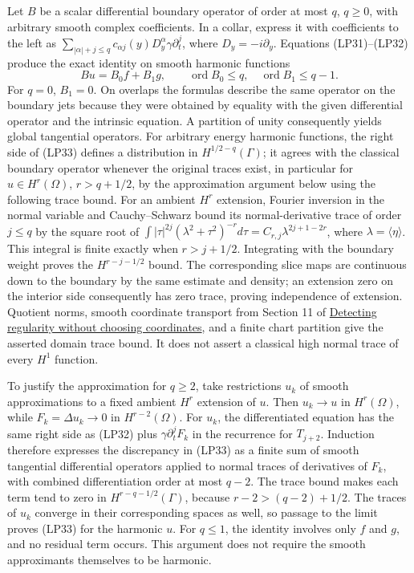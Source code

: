 \documentclass[
  11pt,
]{article}
\begin{document}
Let \(B\) be a scalar differential boundary operator of order at most
\(q\), \(q\ge0\), with arbitrary smooth complex coefficients. In a
collar, express it with coefficients to the left as
\(\sum_{|\alpha|+j\le q}c_{\alpha j}(y)D_y^\alpha\gamma\partial_t^j\),
where \(D_y=-i\partial_y\). Equations (LP31)--(LP32) produce the exact
identity on smooth harmonic functions \[
 Bu=B_0f+B_1g,\qquad
 \operatorname{ord}B_0\le q,\quad
 \operatorname{ord}B_1\le q-1.
 \tag{LP33}
\] For \(q=0\), \(B_1=0\). On overlaps the formulas describe the same
operator on the boundary jets because they were obtained by equality
with the given differential operator and the intrinsic equation. A
partition of unity consequently yields global tangential operators. For
arbitrary energy harmonic functions, the right side of (LP33) defines a
distribution in \(H^{1/2-q}(\Gamma)\); it agrees with the classical
boundary operator whenever the original traces exist, in particular for
\(u\in H^r(\Omega)\), \(r>q+1/2\), by the approximation argument below
using the following trace bound. For an ambient \(H^r\) extension,
Fourier inversion in the normal variable and Cauchy--Schwarz bound its
normal-derivative trace of order \(j\le q\) by the square root of
\(\int |\tau|^{2j}(\lambda^2+\tau^2)^{-r}d\tau=C_{r,j}\lambda^{2j+1-2r}\),
where \(\lambda=\langle\eta\rangle\). This integral is finite exactly
when \(r>j+1/2\). Integrating with the boundary weight proves the
\(H^{r-j-1/2}\) bound. The corresponding slice maps are continuous down
to the boundary by the same estimate and density; an extension zero on
the interior side consequently has zero trace, proving independence of
extension. Quotient norms, smooth coordinate transport from Section 11
of \href{geometric-microlocal-calculus.pdf}{Detecting regularity without
choosing coordinates}, and a finite chart partition give the asserted
domain trace bound. It does not assert a classical high normal trace of
every \(H^1\) function.

To justify the approximation for \(q\ge2\), take restrictions \(u_k\) of
smooth approximations to a fixed ambient \(H^r\) extension of \(u\).
Then \(u_k\to u\) in \(H^r(\Omega)\), while \(F_k=\Delta u_k\to0\) in
\(H^{r-2}(\Omega)\). For \(u_k\), the differentiated equation has the
same right side as (LP32) plus \(\gamma\partial_t^jF_k\) in the
recurrence for \(T_{j+2}\). Induction therefore expresses the
discrepancy in (LP33) as a finite sum of smooth tangential differential
operators applied to normal traces of derivatives of \(F_k\), with
combined differentiation order at most \(q-2\). The trace bound makes
each term tend to zero in \(H^{r-q-1/2}(\Gamma)\), because
\(r-2>(q-2)+1/2\). The traces of \(u_k\) converge in their corresponding
spaces as well, so passage to the limit proves (LP33) for the harmonic
\(u\). For \(q\le1\), the identity involves only \(f\) and \(g\), and no
residual term occurs. This argument does not require the smooth
approximants themselves to be harmonic.
\end{document}
